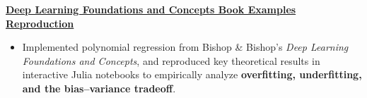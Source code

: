 \documentclass[a4paper,12pt]{article}
\begin{document}
\noindent
\href{https://github.com/MendeBadra/DeepLearningBishopFigures}
{\textbf{Deep Learning Foundations and Concepts Book Examples Reproduction}}

\begin{itemize}[nosep,after=\strut,leftmargin=1em,itemsep=3pt,label=--]
  \item Implemented polynomial regression from Bishop \& Bishop's \textit{Deep Learning Foundations and Concepts}, and reproduced key theoretical results in interactive Julia notebooks to empirically analyze \textbf{overfitting, underfitting, and the bias--variance tradeoff}.
  

\end{itemize}




  


\end{document}
